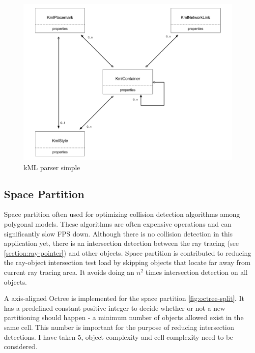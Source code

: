 \begin{figure}[H]
\caption{kML parser simple}
\label{fig:kml-parser-simple}
\centering
\includegraphics[width=\linewidth]{Figures/kml-parser-simple.png}
\decoRule
\end{figure}

\subsection{Space Partition} 
\label{section:space-partition}

Space partition often used for optimizing collision detection algorithms among polygonal models. These algorithms are often expensive operations and can significantly slow FPS down. Although there is no collision detection in this application yet, there is an intersection detection between the ray tracing (see \ref{section:ray-pointer}) and other objects. Space partition is contributed to reducing the ray-object intersection test load by skipping objects that locate far away from current ray tracing area. It avoids doing an $n^2$ times intersection detection on all objects.

A axis-aligned Octree is implemented for the space partition \ref{fig:octree-split}. It has a predefined constant positive integer to decide whether or not a new partitioning should happen - a minimum number of objects allowed exist in the same cell. This number is important for the purpose of reducing intersection detections. I have taken $5$, object complexity and cell complexity need to be considered.

